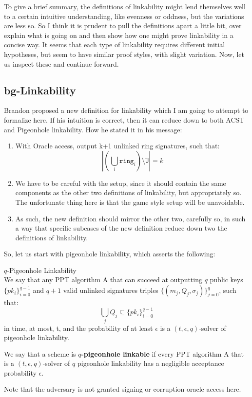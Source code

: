 \documentclass[12pt,titlepage]{article}
\begin{document}
To give a brief summary, the definitions of linkability might lend themselves well to a certain intuitive understanding, like evenness or oddness, but the variations are less so. So I think it is prudent to pull the definitions apart a little bit, over explain what is going on and then show how one might prove linkability in a concise way. It seems that each type of linkability requires different initial hypotheses, but seem to have similar proof styles, with slight variation. Now, let us inspect these and continue forward.
\subsection{bg-Linkability}
Brandon proposed a new definition for linkability which I am going to attempt to formalize here. If his intuition is correct, then it can reduce down to both ACST and Pigeonhole linkability. How he stated it in his message:
\begin{enumerate}
\item With Oracle access, output k+1 unlinked ring signatures, such that:
$$\left| \left( \bigcup_i \mathtt{ring}_i \right) \setminus \mathtt{U} \right| = k$$
\item We have to be careful with the setup, since it should contain the same components as the other two definitions of linkability, but appropriately so. The unfortunate thing here is that the game style setup will be unavoidable.
\item As such, the new definition should mirror the other two, carefully so, in such a way that specific subcases of the new definition reduce down two the definitions of linkability.
\end{enumerate}
\newpage
So, let us start with pigeonhole linkability, which asserts the following:
\begin{defn} $q$-Pigeonhole Linkability {\\}
We say that any PPT algorithm A that can succeed at outputting $q$ public keys $\{pk_i\}_{i = 0}^{q-1}$ and $q+1$ valid unlinked signatures triples $\{(m_j,Q_j,\sigma_j)\}_{j = 0}^{q}$, such that:
$$\bigcup_{j} Q_j \subseteq \{pk_i\}_{i=0}^{q-1}$$
in time, at most, t, and the probability of at least $\epsilon$ is a $(t,\epsilon,q)$-solver of pigeonhole linkability. 

We say that a scheme is \textbf{$q$-pigeonhole linkable} if every PPT algorithm A that is a $(t,\epsilon,q)$-solver of $q$ pigeonhole linkability has a negligible acceptance probability $\epsilon$.

Note that the adversary is not granted signing or corruption oracle access here.

\end{defn}
\end{document}
